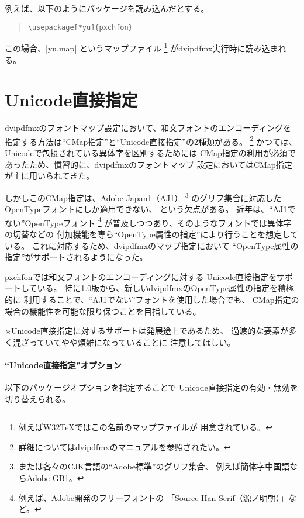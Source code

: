 \documentclass[uplatex,dvipdfmx,a4paper]{jsarticle}
\newcommand{\Pkg}[1]{\textsf{#1}}
\newcommand{\Note}{\par\noindent ※}
\begin{document}
例えば、以下のようにパッケージを読み込んだとする。

\begin{quote}\small\begin{verbatim}
\usepackage[*yu]{pxchfon}
\end{verbatim}\end{quote}

この場合、|yu.map| というマップファイル
\footnote{例えばW32{\TeX}ではこの名前のマップファイルが
  用意されている。}%
がdvipdfmx実行時に読み込まれる。


\section{Unicode直接指定}
\label{sec:DirectUnicode}

dvipdfmxのフォントマップ設定において、和文フォントのエンコーディングを
指定する方法は“CMap指定”と“Unicode直接指定”の2種類がある。
\footnote{詳細についてはdvipdfmxのマニュアルを参照されたい。}
かつては、Unicodeで包摂されている異体字を区別するためには
CMap指定の利用が必須であったため、慣習的に、dvipdfmxのフォントマップ
設定においてはCMap指定が主に用いられてきた。

しかしこのCMap指定は、Adobe-Japan1（AJ1）%
\footnote{または各々のCJK言語の“Adobe標準”のグリフ集合、
例えば簡体字中国語ならAdobe-GB1。}%
のグリフ集合に対応したOpenTypeフォントにしか適用できない、
という欠点がある。
近年は、“AJ1でない”OpenTypeフォント
\footnote{例えば、Adobe開発のフリーフォントの
「Source Han Serif（源ノ明朝）」など。}%
が普及しつつあり、そのようなフォントでは異体字の切替などの
付加機能を専ら“OpenType属性の指定”により行うことを想定している。
これに対応するため、dvipdfmxのマップ指定において
“OpenType属性の指定”がサポートされるようになった。

\Pkg{pxchfon}では和文フォントのエンコーディングに対する
Unicode直接指定をサポートしている。
特に1.0版から、新しいdvipdfmxのOpenType属性の指定を積極的に
利用することで、“AJ1でない”フォントを使用した場合でも、
CMap指定の場合の機能性を可能な限り保つことを目指している。

\Note Unicode直接指定に対するサポートは発展途上であるため、
過渡的な要素が多く混ざっていてやや煩雑になっていることに
注意してほしい。

\paragraph{“Unicode直接指定”オプション}
以下のパッケージオプションを指定することで
Unicode直接指定の有効・無効を切り替えられる。
\end{document}
